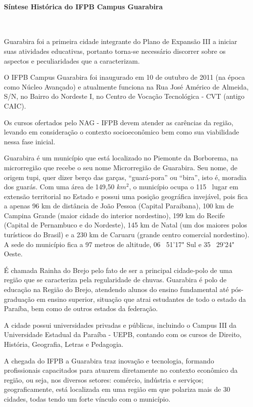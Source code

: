 \paragraph{Síntese Histórica do IFPB Campus Guarabira}\

Guarabira foi a primeira cidade integrante do Plano de Expansão III a iniciar suas atividades educativas, portanto torna-se necessário discorrer sobre os aspectos e peculiaridades que a caracterizam.

O IFPB Campus Guarabira foi inaugurado em 10 de outubro de 2011 (na época como Núcleo Avançado) e atualmente funciona na Rua José Américo de Almeida, S/N, no Bairro do Nordeste I, no Centro de Vocação Tecnológica - CVT (antigo CAIC).

Os cursos ofertados pelo NAG - IFPB devem atender as carências da região, levando em consideração o contexto socioeconômico bem como sua viabilidade nessa fase inicial.

Guarabira é um município que está localizado no Piemonte da Borborema, na microrregião que recebe o seu nome Microrregião de Guarabira. Seu nome, de origem tupi, quer dizer berço das garças, ``guará-pora'' ou ``bira'', isto é, moradia dos guarás. Com uma área de 149,50 $km^2$, o município ocupa o 115~{\degree} lugar em extensão territorial no Estado e possui uma posição geográfica invejável, pois fica a apenas 96 km de distância de João Pessoa (Capital Paraibana), 100 km de Campina Grande (maior cidade do interior nordestino), 199 km do Recife (Capital de Pernambuco e do Nordeste), 145 km de Natal (um dos maiores polos turísticos do Brasil) e a 230 km de Caruaru (grande centro comercial nordestino). A sede do município fica a 97 metros de altitude, 06~{\degree} 51’17" Sul e 35~{\degree} 29’24" Oeste.

É chamada Rainha do Brejo pelo fato de ser a principal cidade-polo de uma região que se caracteriza pela regularidade de chuvas. Guarabira é polo de educação na Região do Brejo, atendendo alunos do ensino fundamental até pós-graduação em ensino superior, situação que atrai estudantes de todo o estado da Paraíba, bem como de outros estados da federação.

A cidade possui universidades privadas e públicas, incluindo o Campus III da Universidade Estadual da Paraíba - UEPB, contando com os cursos de Direito, História, Geografia, Letras e Pedagogia.

A chegada do IFPB a Guarabira traz inovação e tecnologia, formando profissionais capacitados para atuarem diretamente no contexto econômico da região, ou seja, nos diversos setores: comércio, indústria e serviços; geograficamente, está localizada em uma região em que polariza mais de 30 cidades, todas tendo um forte vínculo com o município.

